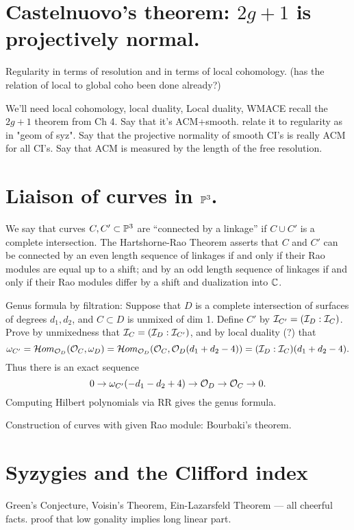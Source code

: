 \section{Castelnuovo's theorem: $2g+1$ is projectively normal.}

 Regularity in terms of resolution and in terms of local cohomology. (has the relation of local to global coho been done already?)

We'll need local cohomology, local duality, 
 Local duality, WMACE
recall the $2g+1$ theorem from Ch 4. Say that it's ACM+smooth. relate it to regularity as in "geom of syz". Say that the projective
normality of smooth CI's is really ACM for all CI's. Say that ACM is measured by the length of the free resolution.


\section{Liaison of curves in ${\mathbb P}^3$.}

\begin{fact} We say that curves $C,C'\subset {\mathbb P}^{3}$ are ``connected by a linkage'' if $C\cup C'$
is a complete intersection.
 The Hartshorne-Rao Theorem \cite{} asserts that 
$C$ and $C'$ can be connected by an even length sequence of linkages if and only if their Rao modules are equal up to a shift; and by an odd length sequence of linkages if and only if their Rao modules differ by a shift and dualization into ${\mathbb C}$.
\end{fact}


Genus formula by filtration: Suppose that $D$ is a complete intersection of surfaces of degrees $d_1,d_2$, and 
$C\subset D$ is unmixed of dim 1. Define $C'$ by ${\mathcal I}_{C'} = ({\mathcal I}_D:{\mathcal I}_C)$. Prove by unmixedness that 
${\mathcal I}_C = ({\mathcal I}_D:{\mathcal I}_{C'})$,  and by local duality (?) that 
$$
\omega_{C'} = \mathcal{H}om_{{\mathcal O}_D}({\mathcal O}_C, \omega_D) = 
\mathcal{H}om_{{\mathcal O}_D}({\mathcal O}_C, {\mathcal O}_D(d_1+d_2-4))
=  ({\mathcal I}_D:{\mathcal I}_C)(d_1+d_2-4).
$$
Thus there is an exact sequence
$$
0\to \omega_{C'}(-d_1-d_2+4) \to {\mathcal O}_D \to {\mathcal O}_C \to 0.
$$
Computing Hilbert polynomials via RR gives the genus formula.

Construction of curves with given Rao module: Bourbaki's theorem.




\section{Syzygies and the Clifford index}
Green's Conjecture, Voisin's Theorem, Ein-Lazarsfeld Theorem --- all cheerful facts. proof that low gonality implies long linear part.


